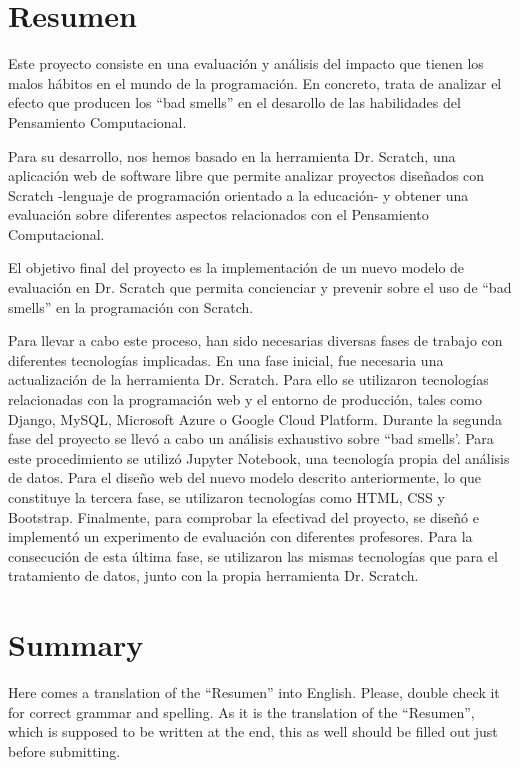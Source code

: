 

\chapter*{Resumen}

Este proyecto consiste en una evaluación y análisis del impacto que tienen los malos hábitos en el mundo de la programación. En concreto, trata de analizar el efecto que producen los ``bad smells'' en el desarollo de las habilidades del Pensamiento Computacional.  

Para su desarrollo, nos hemos basado en la herramienta Dr. Scratch, una aplicación web de software libre que permite analizar proyectos diseñados con Scratch -lenguaje de programación orientado a la educación- y obtener una evaluación sobre diferentes aspectos relacionados con el Pensamiento Computacional.

El objetivo final del proyecto es la implementación de un nuevo modelo de evaluación en Dr. Scratch que permita concienciar y prevenir sobre el uso de ``bad smells'' en la programación con Scratch. 

Para llevar a cabo este proceso, han sido necesarias diversas fases de trabajo con diferentes tecnologías implicadas. En una fase inicial, fue necesaria una actualización de la herramienta Dr. Scratch. Para ello se utilizaron tecnologías relacionadas con la programación web y el entorno de producción, tales como Django, MySQL, Microsoft Azure o Google Cloud Platform. Durante la segunda fase del proyecto se llevó a cabo un análisis exhaustivo sobre ``bad smells'. Para este procedimiento se utilizó Jupyter Notebook, una tecnología propia del análisis de datos. Para el diseño web del nuevo modelo descrito anteriormente, lo que constituye la tercera fase, se utilizaron tecnologías como HTML, CSS y Bootstrap. Finalmente, para comprobar la efectivad del proyecto, se diseñó e implementó un experimento de evaluación con diferentes profesores. Para la consecución de esta última fase, se utilizaron las mismas tecnologías que para el tratamiento de datos, junto con la propia herramienta Dr. Scratch.



\chapter*{Summary}

Here comes a translation of the ``Resumen'' into English. 
Please, double check it for correct grammar and spelling.
As it is the translation of the ``Resumen'', which is supposed to be written at the end, this as well should be filled out just before submitting.
